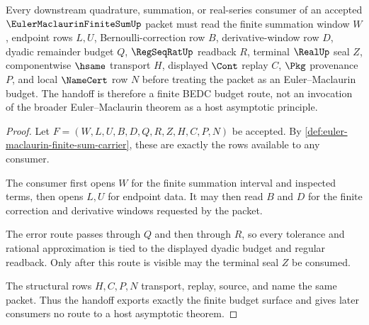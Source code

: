 \begin{theorem}
\label{thm:euler-maclaurin-finite-sum-budget-handoff}
Every downstream quadrature, summation, or real-series consumer of an accepted $\EulerMaclaurinFiniteSumUp$ packet must read the finite summation window $W$, endpoint rows $L,U$, Bernoulli-correction row $B$, derivative-window row $D$, dyadic remainder budget $Q$, $\RegSeqRatUp$ readback $R$, terminal $\RealUp$ seal $Z$, componentwise $\hsame$ transport $H$, displayed $\Cont$ replay $C$, $\Pkg$ provenance $P$, and local $\NameCert$ row $N$ before treating the packet as an Euler--Maclaurin budget. The handoff is therefore a finite BEDC budget route, not an invocation of the broader Euler--Maclaurin theorem as a host asymptotic principle.
\end{theorem}
\begin{proof}
Let $F=(W,L,U,B,D,Q,R,Z,H,C,P,N)$ be accepted. By \autoref{def:euler-maclaurin-finite-sum-carrier}, these are exactly the rows available to any consumer.

The consumer first opens $W$ for the finite summation interval and inspected terms, then opens $L,U$ for endpoint data. It may then read $B$ and $D$ for the finite correction and derivative windows requested by the packet.

The error route passes through $Q$ and then through $R$, so every tolerance and rational approximation is tied to the displayed dyadic budget and regular readback. Only after this route is visible may the terminal seal $Z$ be consumed.

The structural rows $H,C,P,N$ transport, replay, source, and name the same packet. Thus the handoff exports exactly the finite budget surface and gives later consumers no route to a host asymptotic theorem.
\end{proof}


